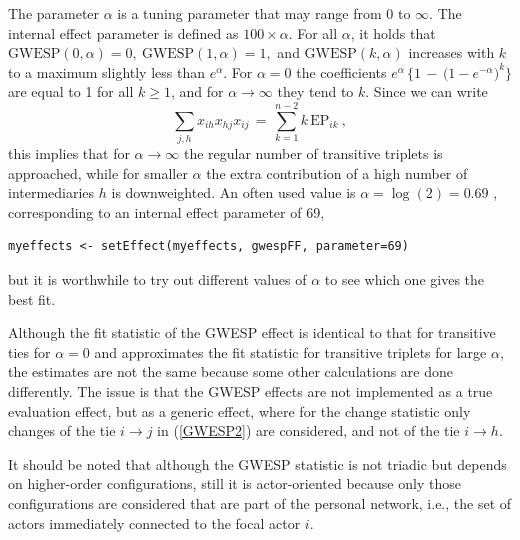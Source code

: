 \documentclass[a4paper,fleqn,11pt]{article}
\newcommand{\+}{\, + \,}
\begin{document}
\begin{enumerate}
The parameter $\alpha$ is a tuning parameter that may range from 0 to $\infty$.
The internal effect parameter is defined as $100 \times \alpha$.
For all $\alpha$, it holds that
$ \text{GWESP}(0, \alpha) = 0,\  \text{GWESP}(1, \alpha) = 1,$
and $\text{GWESP}(k, \alpha) $ increases with $k$ to a maximum
slightly less than $e^\alpha$.
For $\alpha = 0$ the coefficients
$e^{\alpha} \,\big\{1 \,-\, \big(1 - e^{-\alpha}\big)^k\big\} $
are equal to 1 for all $k \geq 1$,
and for $\alpha \rightarrow \infty$ they tend to $k$.
Since we can write
\[
  \sum_{j,h} x_{ih}x_{hj}x_{ij} \,=\, \sum_{k=1}^{n-2} k\, \text{EP}_{ik}   \ ,
\]
this implies that for $\alpha \rightarrow \infty$  the regular number
of transitive triplets is approached, while for smaller $\alpha$
the extra contribution of a high number of intermediaries $h$
is downweighted.
An often used value is $\alpha = \log(2) = 0.69$ \citep{SPRH06},
corresponding to an internal effect parameter of 69,
\begin{verbatim}
myeffects <- setEffect(myeffects, gwespFF, parameter=69)
\end{verbatim}
but it is worthwhile to try out different values of $\alpha$
to see which one gives the best fit.

Although the fit statistic of the GWESP effect is identical to that
for transitive ties for $\alpha=0$ and approximates the fit
statistic for transitive triplets
for large $\alpha$, the estimates are not the same because some other
calculations are done differently. The issue is that the GWESP effects are
not implemented as a true evaluation effect, but as a generic effect,
where for the change statistic only changes of the tie $i \rightarrow j$ in
(\ref{GWESP2}) are considered, and not of the tie $i \rightarrow h$.


It should be noted that although the GWESP statistic is not triadic but
depends on higher-order configurations, still it is actor-oriented
because only those configurations are considered that are part of the
personal network, i.e., the set of actors immediately connected
to the focal actor $i$.


\end{enumerate}
\end{document}
